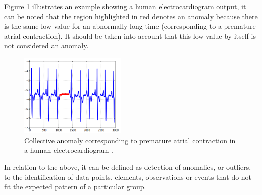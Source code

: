 \begin{enumerate}[1.]
\vspace{5mm} %

Figure \ref{fig:anom_col} illustrates an example showing a human electrocardiogram output, it can be noted that the region highlighted in red denotes an anomaly because there is the same low value for an abnormally long time (corresponding to a premature atrial contraction). It should be taken into account that this low value by itself is not considered an anomaly.

\begin{figure}[h!]
  \begin{center}	\includegraphics[width=0.45\textwidth,frame]{imagenes/Cap2/anom_col}
  \caption{Collective anomaly corresponding to premature atrial contraction in a human electrocardiogram \protect\cite{Reference66}.}
  \label{fig:anom_col}
  \end{center}
\end{figure}

\end{enumerate}

In relation to the above, it can be defined as detection of anomalies, or outliers, to the identification of data points, elements, observations or events that do not fit the expected pattern of a particular group.

\vspace{5mm} %

